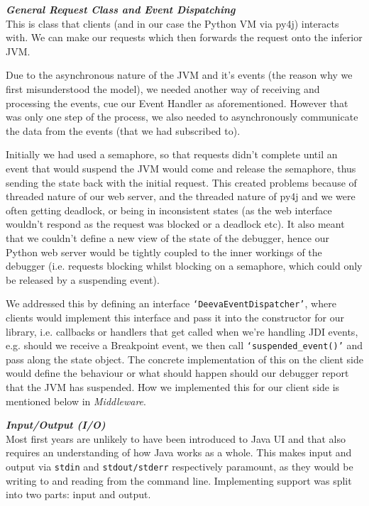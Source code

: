 \documentclass[11pt, a4paper]{article}
\begin{document}

\textbf{\emph{General Request Class and Event Dispatching}}\\
This is class that clients (and in our case the Python VM via py4j) interacts with.
We can make our requests which then forwards the request onto the inferior JVM.

Due to the asynchronous nature of the JVM and it's events (the reason why we first misunderstood the model), we needed another way of receiving and processing the events, cue our Event Handler as aforementioned.
However that was only one step of the process, we also needed to asynchronously communicate the data from the events (that we had subscribed to).

Initially we had used a semaphore, so that requests didn't complete until an event that would suspend the JVM would come and release the semaphore, thus sending the state back with the initial request.
This created problems because of threaded nature of our web server, and the threaded nature of py4j and we were often getting deadlock, or being in inconsistent states (as the web interface wouldn't respond as the request was blocked or a deadlock etc).
It also meant that we couldn't define a new view of the state of the debugger, hence our Python web server would be tightly coupled to the inner workings of the debugger (i.e. requests blocking whilst blocking on a semaphore, which could only be released by a suspending event).

We addressed this by defining an interface \texttt{`DeevaEventDispatcher'}, where clients would implement this interface and pass it into the constructor for our library, i.e. callbacks or handlers that get called when we're handling JDI events, e.g. should we receive a Breakpoint event, we then call \texttt{`suspended\_event()'} and pass along the state object.
The concrete implementation of this on the client side would define the behaviour or what should happen should our debugger report that the JVM has suspended.
How we implemented this for our client side is mentioned below in \emph{Middleware}.

\textbf{\emph{Input/Output (I/O)}}\\
Most first years are unlikely to have been introduced to Java UI and that also requires an understanding of how Java works as a whole.
This makes input and output via \texttt{stdin} and \texttt{stdout/stderr} respectively paramount, as they would be writing to and reading from the command line.
Implementing support was split into two parts: input and output.
\end{document}
